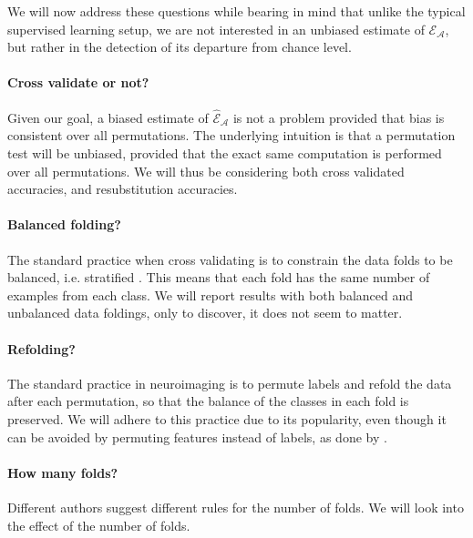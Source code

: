 \documentclass[12pt,a4paper]{article}
\theoremstyle{definition}
\newcommand{\acc}{\mathcal{E}}
\newcommand{\accEstim}{\hat{\mathcal{E}}}
\newcommand{\algo}{\mathcal{A}}
\begin{document}
We will now address these questions while bearing in mind that unlike the typical supervised learning setup, we are not interested in an unbiased estimate of $\acc_{\algo}$, but rather in the detection of its departure from chance level. 

\paragraph{Cross validate or not?}
Given our goal, a biased estimate of $\accEstim_{\algo}$ is not a problem provided that bias is consistent over all permutations. 
The underlying intuition is that a permutation test will be unbiased, provided that the exact same computation is performed over all permutations. 
We will thus be considering both cross validated accuracies, and resubstitution accuracies.


\paragraph{Balanced folding?}
The standard practice when cross validating is to constrain the data folds to be balanced, i.e. stratified \citep[e.g.][]{ojala_permutation_2010}.
This means that each fold has the same number of examples from each class. 
We will report results with both balanced and unbalanced data foldings, only to discover, it does not seem to matter. 


\paragraph{Refolding?}
The standard practice in neuroimaging is to permute labels and refold the data after each permutation, so that the balance of the classes in each fold is preserved.
We will adhere to this practice due to its popularity, even though it can be avoided by permuting features instead of labels, as done by \citet{golland_permutation_2005}.


\paragraph{How many folds?}
Different authors suggest different rules for the number of folds. 
We will look into the effect of the number of folds. 
\end{document}
